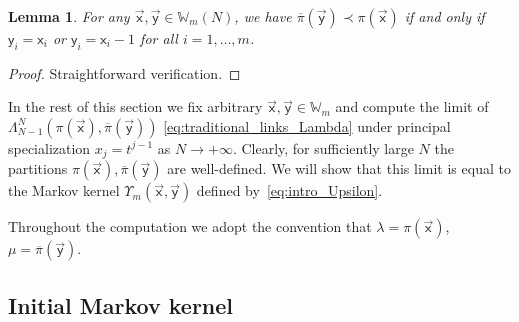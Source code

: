 \documentclass[pdftex]{sigma}
\numberwithin{equation}{section}
\newtheorem{Lemma}[Theorem]{Lemma}
\begin{document}
\begin{Lemma}	\label{lemma:interlacing}
	For any $\vec{\mathsf{x}},\vec{\mathsf{y}}\in \mathbb{W}_m(N)$,
	we have $\overline\pi(\vec{\mathsf{y}})\prec \pi(\vec{\mathsf{x}})$
	if and only if $\mathsf{y}_i=\mathsf{x}_i$ or $\mathsf{y}_i=\mathsf{x}_i-1$
	for all $i=1,\dots,m $.
\end{Lemma}
\begin{proof}
	Straightforward verification.
\end{proof}

In the rest of this section we
fix arbitrary $\vec{\mathsf{x}},\vec{\mathsf{y}}\in \mathbb{W}_m$ and
compute the limit of
$\Lambda^{N}_{N-1}(\pi(\vec{\mathsf{x}}),\overline\pi(\vec{\mathsf{y}}))$
\eqref{eq:traditional_links_Lambda}
under principal
specialization $x_j=t^{j-1}$
as $N\to+\infty$. Clearly, for sufficiently large $N$ the
partitions
$\pi(\vec{\mathsf{x}}),\overline\pi(\vec{\mathsf{y}})$
are well-defined.
We will show that this limit is equal
to the Markov kernel $\Upsilon_m(\vec{\mathsf{x}},\vec{\mathsf{y}})$
defined by~\eqref{eq:intro_Upsilon}.

Throughout the computation we adopt the convention
that
$\lambda=\pi(\vec{\mathsf{x}})$, $\mu=\overline\pi(\vec{\mathsf{y}})$.

\subsection{Initial Markov kernel}\label{sub:computation_initial_formula}
\end{document}
